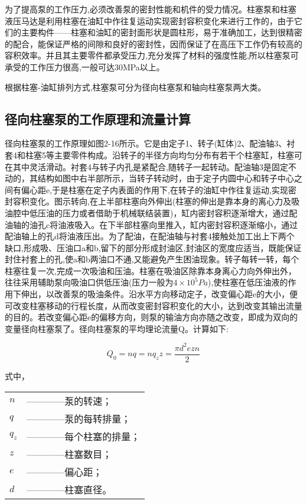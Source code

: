 为了提高泵的工作压力,必须改善泵的密封性能和机件的受力情况。柱塞泵和柱塞液压马达是利用柱塞在油缸中作往复运动实现密封容积变化来进行工作的，由于它们的主要构件——柱塞和油缸的密封面形状是圆柱形，易于准确加工，达到很精密的配合，能保证严格的间隙和良好的密封性，因而保证了在高压下工作仍有较高的容积效率。并且其主要零件都承受压力,充分发挥了材料的强度性能,所以柱塞泵可承受的工作压力很高,一般可达30MPa以上。

根据柱塞-油缸排列方式,柱塞泵可分为径向柱塞泵和轴向柱塞泵两大类。

\subsection{径向柱塞泵的工作原理和流量计算}

径向柱塞泵的工作原理如图2-16所示。它是由定子1、转子(缸体)2、配油轴3、衬套4和柱塞5等主要零件构成。沿转子的半径方向均匀分布有若干个柱塞缸，柱塞可在其中灵活滑动。衬套4与转子内孔是紧配合,随转子一起转动。配油轴3是固定不动的，其结构如图中右半部所示，当转子转动时，由于定子内圆中心和转子中心之间有偏心距e,于是柱塞在定子内表面的作用下,在转子的油缸中作往复运动,实现密封容积变化。图示转向,在上半部柱塞向外伸出(柱塞的伸出是靠本身的离心力及吸油腔中低压油的压力或者借助于机械联结装置)，缸内密封容积逐渐增大，通过配油轴的油孔c将油液吸入。在下半部柱塞向里推入，缸内密封容积逐渐缩小，通过配油轴上的孔d将油液压出。为了配油，在配油轴与衬套4接触处加工出上下两个缺口,形成吸、压油口a和b,留下的部分形成封油区,封油区的宽度应适当，既能保证封住衬套上的孔,使a和b两油口不通,又能避免产生困油现象。转子每转一转，每个柱塞往复一次,完成一次吸油和压油。柱塞在吸油区除靠本身离心力向外伸出外，往往采用辅助泵向吸油口供低压油(压力一般为$4\times 10^{5} Pa$),使柱塞在低压油液的作用下伸出，以改善泵的吸油条件。沿水平方向移动定子，改变偏心距e的大小，便可改变柱塞移动的行程长度，从而改变密封容积变化的大小，达到改变其输出流量的目的。若改变偏心距e的偏移方向，则泵的输油方向亦随之改变，即成为双向的变量径向柱塞泵了。径向柱塞泵的平均理论流量Q。计算如下:

\begin{equation}
Q_{0}=nq=nq_{z}z=\frac{\pi d^{2}ezn}{2}
\end{equation}

\noindent 式中，
\begin{tabular}[t]{ll}
 $n$ & ————泵的转速；\\ 
 $q$ & ————泵的每转排量； \\
 $q_{z}$ & ————每个柱塞的排量； \\
 $z$ & ————柱塞数目； \\
 $e$ & ————偏心距； \\
 $d$ & ————柱塞直径。
\end{tabular}


